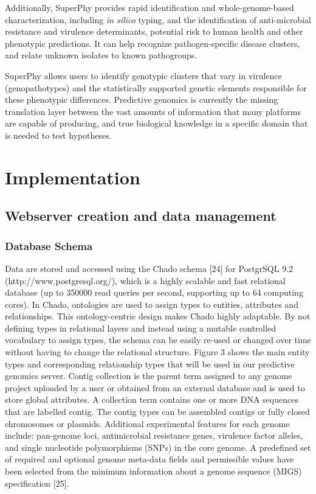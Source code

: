 \documentclass{bmcart}
\begin{document}
Additionally, SuperPhy provides rapid identification and whole-genome-based characterization, including \textit{in silico} typing, and the identification of anti-microbial resistance and virulence determinants, potential risk to human health and other phenotypic predictions. It can help recognize pathogen-specific disease clusters, and relate unknown isolates to known pathogroups.

SuperPhy allows users to identify genotypic clusters that vary in virulence (genopathotypes) and the statistically supported genetic elements responsible for these phenotypic differences. Predictive genomics is currently the missing translation layer between the vast amounts of information that many platforms are capable of producing, and true biological knowledge in a specific domain that is needed to test hypotheses.


\section*{Implementation}
\subsection{Webserver creation and data management}
\subsubsection{Database Schema}
Data are stored and accessed using the Chado schema [24] for PostgrSQL 9.2 (http://www.postgresql.org/), which is a highly scalable and fast relational database (up to 350000 read queries per second, supporting up to 64 computing cores). In Chado, ontologies are used to assign types to entities, attributes and relationships. This ontology-centric design makes Chado highly adaptable. By not defining types in relational layers and instead using a mutable controlled vocabulary to assign types, the schema can be easily re-used or changed over time without having to change the relational structure. Figure 3 shows the main entity types and corresponding relationship types that will be used in our predictive genomics server. Contig collection is the parent term assigned to any genome project uploaded by a user or obtained from an external database and is used to store global attributes. A collection term contains one or more DNA sequences that are labelled contig. The contig types can be assembled contigs or fully closed chromosomes or plasmids. Additional experimental features for each genome include: pan-genome loci, antimicrobial resistance genes, virulence factor alleles, and single nucleotide polymorphisms (SNPs) in the core genome. A predefined set of required and optional genome meta-data fields and permissible values have been selected from the minimum information about a genome sequence (MIGS) specification [25].
\end{document}
